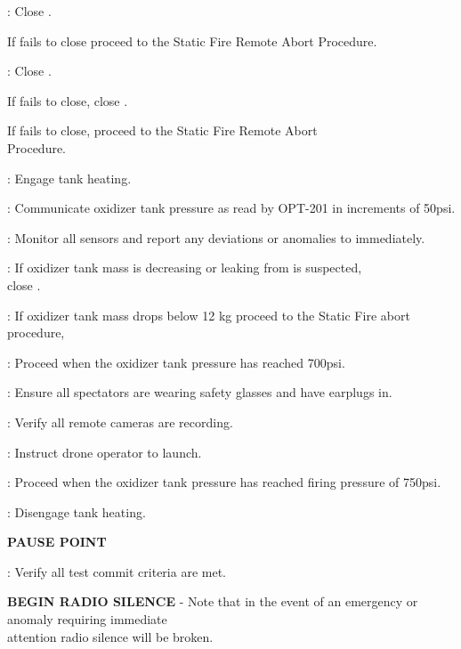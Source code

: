 \begin{checklist}
\begin{checklist}[label=$\bullet$]
    \end{checklist}
    \item \rlcs{}: Close \oxfill{}.
    \begin{checklist}[label=$\bullet$]
        \item If \oxfill{} fails to close proceed to the Static Fire Remote Abort Procedure.
    \end{checklist}
    \item \rlcs{}: Close \vent{}.
    \begin{checklist}[label=$\bullet$]
        \item If \ventnum{} fails to close, close \oxiso.
        \item If \oxiso{} fails to close, proceed to the Static Fire Remote Abort \\ \phantom{} \hspace{8ex} Procedure.
    \end{checklist}
    \item \rlcs{}: Engage tank heating.
    \item \daq{}: Communicate oxidizer tank pressure as read by OPT-201 in increments of 50psi.
    \item \daq{}: Monitor all sensors and report any deviations or anomalies to \ops{} immediately. 
    \item \ops{}: If oxidizer tank mass is decreasing or leaking from \vent{} is suspected, \\ \phantom{} \hspace{3ex} close \oxiso{}. 
    \item \ops{}: If oxidizer tank mass drops below 12 kg proceed to the Static Fire abort procedure,
    \item \ops{}: Proceed when the oxidizer tank pressure has reached 700psi. 
    \item \ops{}: Ensure all spectators are wearing safety glasses and have earplugs in. 
    \item \ops{}: Verify all remote cameras are recording. 
    \item \ops{}: Instruct drone operator to launch. 
    \item \ops{}: Proceed when the oxidizer tank pressure has reached firing pressure of 750psi.  
    \item \rlcs{}: Disengage tank heating. 
    \item \textbf{PAUSE POINT}
    \item \ops{}: Verify all test commit criteria are met. 
    \item \textbf{BEGIN RADIO SILENCE} - Note that in the event of an emergency or anomaly requiring immediate \\ \phantom{} \hspace{3ex} attention radio silence will be broken. 

\end{checklist}

